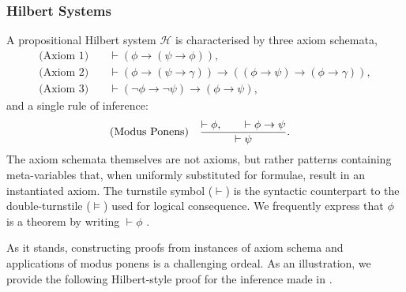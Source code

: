 \subsubsection{Hilbert Systems}
\label{subsubsection:hilbert-systems} 

A propositional Hilbert system $\mathcal{H}$ is characterised by three axiom schemata, 
\begin{align}
	\text{(Axiom 1)}\quad & \vdash (\phi \rightarrow (\psi \rightarrow \phi)),                                                                               \\
	\text{(Axiom 2)}\quad & \vdash (\phi \rightarrow (\psi \rightarrow \gamma)) \rightarrow ((\phi \rightarrow \psi) \rightarrow (\phi \rightarrow \gamma)), \\
	\text{(Axiom 3)}\quad & \vdash (\neg \phi \rightarrow \neg \psi) \rightarrow (\phi \rightarrow \psi),
\end{align}
%
and a single rule of inference:
%
\begin{align}
	\index{Rule of inference! \textit{modus ponens}}\text{(Modus Ponens)}\quad & \frac{\vdash \phi, \qquad \vdash \phi \rightarrow \psi}{\vdash \psi}.
\end{align}
%
The axiom schemata themselves are not axioms, but rather patterns containing meta-variables that, when uniformly substituted
for formulae, result in an instantiated axiom. The turnstile symbol ($\vdash$) is the syntactic counterpart to the double-turnstile
($\vDash$) used for logical consequence. We frequently express that $\phi$ is a theorem by writing $\vdash \phi$
\cite[p. 55]{Ben1993Mathematical}.

As it stands, constructing proofs from instances of axiom schema and applications of modus ponens is a challenging ordeal.
As an illustration, we provide the following Hilbert-style proof for the inference made in .


